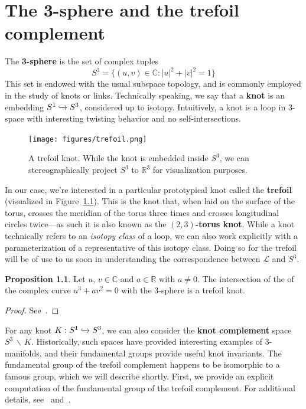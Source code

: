 \documentclass[12pt,twoside]{reedthesis}
\theoremstyle{definition}
\newtheorem{prop}[thm]{Proposition}
\newcommand{\R}{\mathbb{R}}
\newcommand{\C}{\mathbb{C}}
\newcommand{\LS}{\mathcal{L}}
\newcommand{\into}{\xhookrightarrow{}}
\newcommand{\wo}{\, \backslash \,}
\newcommand{\defnphrase}[1]{\textbf{#1}}
\begin{document}
\chapter{The 3-sphere and the trefoil complement}\label{sec:three_sphere}

The \defnphrase{3-sphere} is the set of complex tuples
\begin{equation*}
  S^3 = \{ (u, v) \in \C : |u|^2 + |v|^2 = 1 \}
\end{equation*}
This set is endowed with the usual subspace topology, and is commonly employed in the study of knots or links.
Technically speaking, we say that a \defnphrase{knot} is an embedding $S^1 \into S^3$, considered up to isotopy.
Intuitively, a knot is a loop in 3-space with interesting twisting behavior and no self-intersections.

\begin{figure}[h]
  \centering
  \texttt{[image: figures/trefoil.png]}
  \caption{A trefoil knot. While the knot is embedded inside $S^3$, we can stereographically project $S^3$ to $\R^3$ for visualization purposes.}
  \label{fig:trefoil}
\end{figure}

In our case, we're interested in a particular prototypical knot called the \defnphrase{trefoil} (visualized in Figure~\ref{fig:trefoil}).
This is the knot that, when laid on the surface of the torus, crosses the meridian of the torus three times and crosses longitudinal circles twice---as such it is also known as the \defnphrase{$(2, 3)$-torus knot}.
While a knot technically refers to an \emph{isotopy class} of a loop, we can also work explicitly with a parameterization of a representative of this isotopy class.
Doing so for the trefoil will be of use to us soon in understanding the correspondence between $\LS$ and $S^3$.

\begin{prop}\label{prop:trefoil_intersection_curve}
  Let $u,\, v \in \C$ and $a \in \R$ with $a \neq 0$.
  The intersection of the of the complex curve $u^3 + a v^2 = 0$ with the 3-sphere is a trefoil knot.
\end{prop}

\begin{proof}
  See~\cite[4]{milnor1968}.
\end{proof}

For any knot $K : S^1 \into S^3$, we can also consider the \defnphrase{knot complement} space $S^3 \wo K$.
Historically, such spaces have provided interesting examples of 3-manifolds, and their fundamental groups provide useful knot invariants.
The fundamental group of the trefoil complement happens to be isomorphic to a famous group, which we will describe shortly.
First, we provide an explicit computation of the fundamental group of the trefoil complement.
For additional details, see~\cite[47--49]{hatcher2002} and~\cite[153--154]{stillwell1993}.
\end{document}
